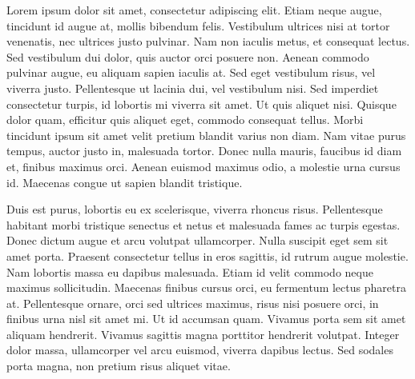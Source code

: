 Lorem ipsum dolor sit amet, consectetur adipiscing elit. Etiam neque augue, tincidunt id augue at, mollis bibendum felis. Vestibulum ultrices nisi at tortor venenatis, nec ultrices justo pulvinar. Nam non iaculis metus, et consequat lectus. Sed vestibulum dui dolor, quis auctor orci posuere non. Aenean commodo pulvinar augue, eu aliquam sapien iaculis at. Sed eget vestibulum risus, vel viverra justo. Pellentesque ut lacinia dui, vel vestibulum nisi. Sed imperdiet consectetur turpis, id lobortis mi viverra sit amet. Ut quis aliquet nisi. Quisque dolor quam, efficitur quis aliquet eget, commodo consequat tellus. Morbi tincidunt ipsum sit amet velit pretium blandit varius non diam. Nam vitae purus tempus, auctor justo in, malesuada tortor. Donec nulla mauris, faucibus id diam et, finibus maximus orci. Aenean euismod maximus odio, a molestie urna cursus id. Maecenas congue ut sapien blandit tristique.

Duis est purus, lobortis eu ex scelerisque, viverra rhoncus risus. Pellentesque habitant morbi tristique senectus et netus et malesuada fames ac turpis egestas. Donec dictum augue et arcu volutpat ullamcorper. Nulla suscipit eget sem sit amet porta. Praesent consectetur tellus in eros sagittis, id rutrum augue molestie. Nam lobortis massa eu dapibus malesuada. Etiam id velit commodo neque maximus sollicitudin. Maecenas finibus cursus orci, eu fermentum lectus pharetra at. Pellentesque ornare, orci sed ultrices maximus, risus nisi posuere orci, in finibus urna nisl sit amet mi. Ut id accumsan quam. Vivamus porta sem sit amet aliquam hendrerit. Vivamus sagittis magna porttitor hendrerit volutpat. Integer dolor massa, ullamcorper vel arcu euismod, viverra dapibus lectus. Sed sodales porta magna, non pretium risus aliquet vitae.